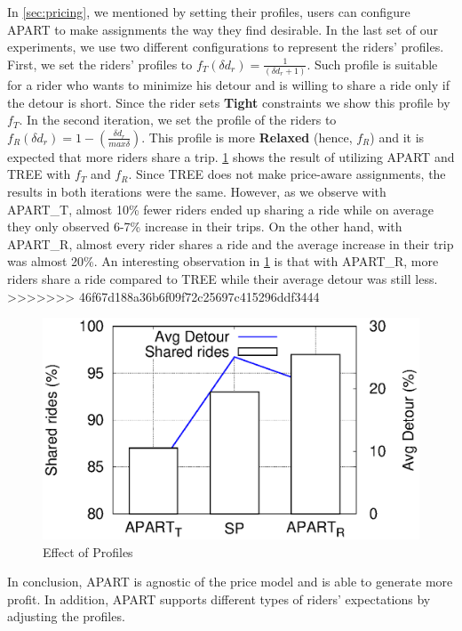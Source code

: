 In \cref{sec:pricing}, we mentioned by setting their profiles, users can configure APART to make assignments the way they find desirable. In the last set of our experiments, we use two different configurations to represent the riders' profiles. First, we set the riders' profiles to $f_T(\delta d_r) = \frac{1}{(\delta d_r + 1)}$. Such profile is suitable for a rider who wants to minimize his detour and is willing to share a ride only if the detour is short. Since the rider sets \textbf{Tight} constraints we show this profile by $f_T$. In the second iteration, we set the profile of the riders to $f_R(\delta d_r) = 1 -  (\frac{\delta d_r}{max \delta})$. This profile is more \textbf{Relaxed} (hence, $f_R$) and it is expected that more riders share a trip. \cref{fig:quality} shows the result of utilizing APART and TREE with $f_T$ and $f_R$. Since TREE does not make price-aware assignments, the results in both iterations were the same. However, as we observe with APART\_T, almost 10\% fewer riders ended up sharing a ride while on average they only observed 6-7\% increase in their trips. On the other hand, with APART\_R, almost every rider shares a ride and the average increase in their trip was almost 20\%. An interesting observation in \cref{fig:quality} is that with APART\_R, more riders share a ride compared to TREE while their average detour was still less.
>>>>>>> 46f67d188a36b6f09f72c25697c415296ddf3444

\begin{figure}[h]
	\centering
    \includegraphics[width = 0.65\columnwidth]{fig/quality.eps}
    \vspace{-0.15in}
    \caption{Effect of Profiles}
    \label{fig:quality}
\end{figure}
\vspace{-0.1in}

In conclusion, APART is agnostic of the price model and is able to generate more profit. In addition, APART supports different types of riders' expectations by adjusting the profiles.